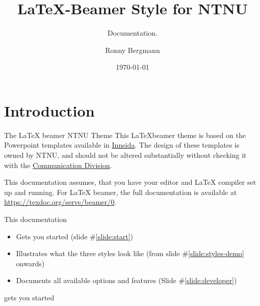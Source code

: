 \documentclass[aspectratio=169]{beamer}
\title{\LaTeX{}-Beamer Style for NTNU}
\subtitle{Documentation.}
\author{Ronny Bergmann}
\date{\today}
\begin{document}
	\maketitle
	\tableofcontents

	\section{Introduction}
		\begin{frame}{The \LaTeX{} beamer NTNU Theme}
			This \LaTeX beamer theme is based on the Powerpoint templates available in \href{https://innsida.ntnu.no/wiki/-/wiki/English/Create+NTNU+presentations\#section-Create+NTNU+presentations-Powerpoint+templates}{Innsida}.
			The design of these templates is owned by NTNU, and should not be altered
	substantially without checking it with the \href{https://www.ntnu.no/adm/komm}{Communication Division}.

			This documentation assumes, that you have your editor and \LaTeX{}  compiler set up and running. For \LaTeX{} beamer, the full documentation is available at \url{https://texdoc.org/serve/beamer/0}.

			This documentation
			\begin{itemize}
				\item Gets you started (slide \#\ref{slide:start})
				\item Illustrates what the three styles look like (from slide \#\ref{slide:styles-demo} onwards)
				\item Documents all available options and features (Slide \#\ref{slide:developer})
			\end{itemize}
			gets you started
		\end{frame}
\end{document}
